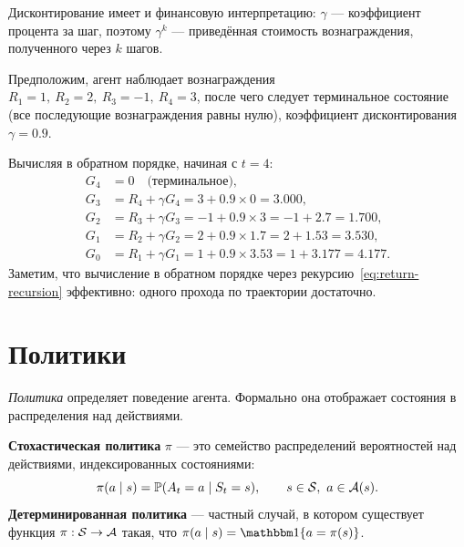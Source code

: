 Дисконтирование имеет и финансовую интерпретацию: $\gamma$ — коэффициент процента за шаг, поэтому $\gamma^k$ — приведённая стоимость вознаграждения, полученного через $k$ шагов.

\begin{example}
\label{ex:return-calc}
Предположим, агент наблюдает вознаграждения $R_1 = 1,\ R_2 = 2,\ R_3 = -1,\ R_4 = 3$, после чего следует терминальное состояние (все последующие вознаграждения равны нулю), коэффициент дисконтирования $\gamma = 0.9$.

Вычисляя в обратном порядке, начиная с $t = 4$:
\begin{align*}
G_4 &= 0 \quad \mbox{(терминальное)}, \\
G_3 &= R_4 + \gamma G_4 = 3 + 0.9 \times 0 = 3.000, \\
G_2 &= R_3 + \gamma G_3 = -1 + 0.9 \times 3 = -1 + 2.7 = 1.700, \\
G_1 &= R_2 + \gamma G_2 = 2 + 0.9 \times 1.7 = 2 + 1.53 = 3.530, \\
G_0 &= R_1 + \gamma G_1 = 1 + 0.9 \times 3.53 = 1 + 3.177 = 4.177.
\end{align*}
Заметим, что вычисление в обратном порядке через рекурсию~\eqref{eq:return-recursion} эффективно: одного прохода по траектории достаточно.
\end{example}


\section{Политики}
\label{sec:policies}

\emph{Политика} определяет поведение агента. Формально она отображает состояния в распределения над действиями.

\begin{definition}[Политика]
\label{def:policy}
\textbf{Стохастическая политика} $\pi$ — это семейство распределений вероятностей над действиями, индексированных состояниями:
\begin{equation}
\label{eq:policy}
\pi(a \mid s) = \mathbb{P}(A_t = a \mid S_t = s), \qquad s \in \mathcal{S},\ a \in \mathcal{A}(s).
\end{equation}
\textbf{Детерминированная политика} — частный случай, в котором существует функция $\pi : \mathcal{S} \to \mathcal{A}$ такая, что $\pi(a \mid s) = \ind\{a = \pi(s)\}$.
\end{definition}

